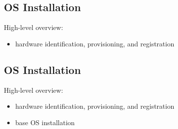 \documentclass[xga]{xdvislides}
\begin{document}
%
%
%
%

\subsection{OS Installation}
High-level overview:
\begin{itemize}
	\item hardware identification, provisioning, and registration
\end{itemize}

\subsection{OS Installation}
High-level overview:
\begin{itemize}
	\item hardware identification, provisioning, and registration
	\item base OS installation
\end{itemize}
\end{document}
